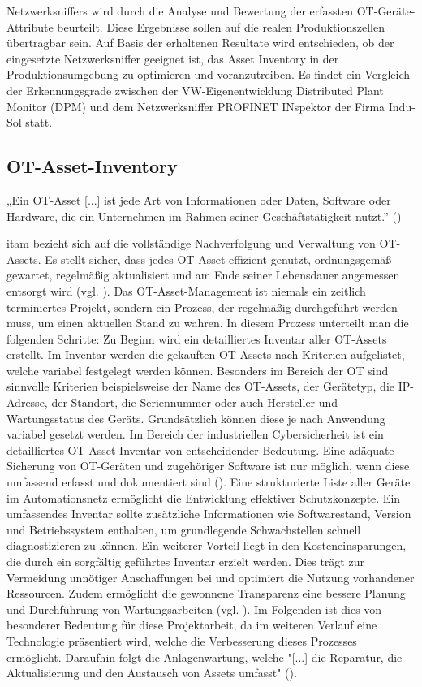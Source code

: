 Netzwerksniffers wird durch die Analyse und Bewertung der erfassten OT-Geräte-Attribute beurteilt. Diese Ergebnisse sollen auf die realen Produktionszellen übertragbar sein. Auf Basis der erhaltenen Resultate wird entschieden, ob der eingesetzte Netzwerksniffer geeignet ist, das Asset Inventory in der Produktionsumgebung zu optimieren und voranzutreiben. Es findet ein Vergleich der Erkennungsgrade zwischen der VW-Eigenentwicklung Distributed Plant Monitor (DPM) und dem Netzwerksniffer PROFINET INspektor der Firma Indu-Sol statt.

\subsection{OT-Asset-Inventory}

  „Ein OT-Asset [...] ist jede Art von Informationen oder Daten, Software oder Hardware, die ein Unternehmen im Rahmen seiner Geschäftstätigkeit nutzt.'' (\cite{IBM})

\ac{itam} bezieht sich auf die vollständige Nachverfolgung und Verwaltung von OT-Assets. Es stellt sicher, dass jedes OT-Asset effizient genutzt, ordnungsgemäß gewartet, regelmäßig aktualisiert und am Ende seiner Lebensdauer angemessen entsorgt wird (vgl. \cite{IBM}). Das OT-Asset-Management ist niemals ein zeitlich terminiertes Projekt, sondern ein Prozess, der regelmäßig durchgeführt werden muss, um einen aktuellen Stand zu wahren. In diesem Prozess unterteilt man die folgenden Schritte: Zu Beginn wird ein detailliertes Inventar aller OT-Assets erstellt. Im Inventar werden die gekauften OT-Assets nach Kriterien aufgelistet, welche variabel festgelegt werden können. Besonders im Bereich der OT sind sinnvolle Kriterien beispielsweise der Name des OT-Assets, der Gerätetyp, die IP-Adresse, der Standort, die Seriennummer oder auch Hersteller und Wartungsstatus des Geräts. Grundsätzlich können diese je nach Anwendung variabel gesetzt werden. Im Bereich der industriellen Cybersicherheit ist ein detailliertes OT-Asset-Inventar von entscheidender Bedeutung. Eine adäquate Sicherung von OT-Geräten und zugehöriger Software ist nur möglich, wenn diese umfassend erfasst und dokumentiert sind (\cite{atlassian}). Eine strukturierte Liste aller Geräte im Automationsnetz ermöglicht die Entwicklung effektiver Schutzkonzepte. Ein umfassendes Inventar sollte zusätzliche Informationen wie Softwarestand, Version und Betriebssystem enthalten, um grundlegende Schwachstellen schnell diagnostizieren zu können. Ein weiterer Vorteil liegt in den Kosteneinsparungen, die durch ein sorgfältig geführtes Inventar erzielt werden. Dies trägt zur Vermeidung unnötiger Anschaffungen bei und optimiert die Nutzung vorhandener Ressourcen. Zudem ermöglicht die gewonnene Transparenz eine bessere Planung und Durchführung von Wartungsarbeiten (vgl. \cite{sichereIndustrie}). Im Folgenden ist dies von besonderer Bedeutung für diese Projektarbeit, da im weiteren Verlauf eine Technologie präsentiert wird, welche die Verbesserung dieses Prozesses ermöglicht. Daraufhin folgt die Anlagenwartung, welche "[...] die Reparatur, die Aktualisierung und den Austausch von Assets umfasst" (\cite{IBM}).
\clearpage

